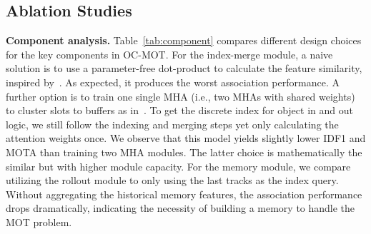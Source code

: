 \subsection{Ablation Studies}
\label{sec:abl_oc}

\noindent\textbf{Component analysis.}
Table~\ref{tab:component} compares different design choices for the key components in OC-MOT. For the index-merge module, a naive solution is to use a parameter-free dot-product to calculate the feature similarity, inspired by~\cite{rahaman2021dynamic}. As expected, it produces the worst association performance. A further option is to train one single MHA (i.e., two MHAs with shared weights) to cluster slots to buffers as in~\cite{Goyal2021RIMs}. To get the discrete index for object in and out logic, we still follow the indexing and merging steps yet only calculating the attention weights once. We observe that this model yields slightly lower IDF1 and MOTA than training two MHA modules. The latter choice is mathematically the similar but with higher module capacity. For the memory module, we compare utilizing the rollout module to only using the last tracks as the index query. Without aggregating the historical memory features, the association performance drops dramatically, indicating the necessity of building a memory to handle the MOT problem.

\begin{table}[!ht]
\centering
{}
\vspace{+0.3cm}
\caption{Ablation on OC-MOT components on CATER.}
\label{tab:component}
\end{table}

